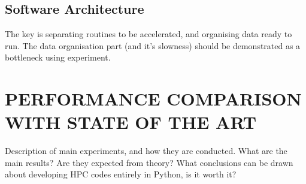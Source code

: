 \documentclass{IEEEcsmag}
\begin{document}
\subsection{Software Architecture}

The key is separating routines to be accelerated, and organising data ready to run. The data organisation part (and it's slowness) should be demonstrated as a bottleneck using experiment.

\section{PERFORMANCE COMPARISON WITH STATE OF THE ART}

Description of main experiments, and how they are conducted. What are the main results? Are they expected from theory? What conclusions can be drawn about developing HPC codes entirely in Python, is it worth it?






\end{document}

